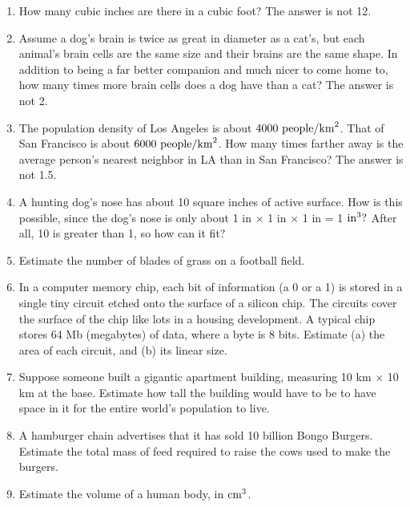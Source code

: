 \begin{enumerate}

\item  How many cubic inches are there in a cubic foot?
The answer is not 12.


\item 
Assume a dog's brain is twice as great in diameter as a
cat's, but each animal's brain cells are the same size and
their brains are the same shape. In addition to being a far
better companion and much nicer to come home to, how many
times more brain cells does a dog have than a cat?
The answer is not 2.

\item
 The population density of Los Angeles is about 
$4000\ \text{people}/\textup{km}^2$. That of San Francisco is about 
$6000\ \text{people}/\zu{km}^2$. How many times farther away is the average
person's nearest neighbor in LA than in San Francisco?
The answer is not 1.5. 


\item 
 A hunting dog's nose has about 10 square inches of active
surface. How is this possible, since the dog's nose is only
about 1 in $\times$ 1 in $\times$ 1 in = 1 $\textup{in}^3?$ After all, 10 is
greater than 1, so how can it fit?

\item 
 Estimate the number of blades of grass on a football field.

\item
 In a computer memory chip, each bit of information (a 0
or a 1) is stored in a single tiny circuit etched onto the
surface of a silicon chip. The circuits cover the surface of
the chip like lots in a housing development. A typical chip
stores 64 Mb (megabytes) of data, where a byte is 8 bits.
Estimate (a) the area of each circuit, and (b) its linear size.


\item  Suppose someone built a gigantic apartment building,
measuring 10 km $\times$ 10 km at the base. Estimate how tall the
building would have to be to have space in it for the entire
world's population to live.

\item 
 A hamburger chain advertises that it has sold 10 billion
Bongo Burgers. Estimate the total mass of feed required to
raise the cows used to make the burgers.

\item 
 Estimate the volume of a human body, in $\textup{cm}^3$.


\end{enumerate}
